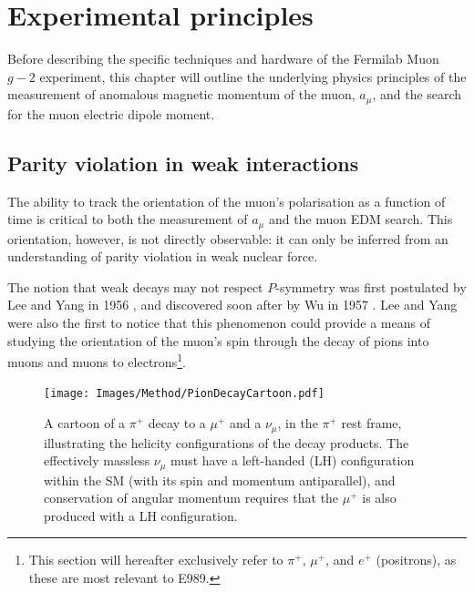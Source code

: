 \chapter{Experimental principles}\label{chap:2}

Before describing the specific techniques and hardware of the Fermilab Muon $g-2$ experiment, this chapter will outline the underlying physics principles of the measurement of anomalous magnetic momentum of the muon, $a_{\mu}$, and the search for the muon electric dipole moment. 

\section{Parity violation in weak interactions}\label{sec:ParityViolation} 

The ability to track the orientation of the muon's polarisation as a function of time is critical to both the measurement of $a_{\mu}$ and the muon EDM search. This orientation, however, is not directly observable: it can only be inferred from an understanding of parity violation in weak nuclear force. 

The notion that weak decays may not respect $P$-symmetry was first postulated by Lee and Yang in 1956 \cite{LeeAndYang}, and discovered soon after by Wu in 1957 \cite{Wu}. Lee and Yang were also the first to notice that this phenomenon could provide a means of studying the orientation of the muon's spin through the decay of pions into muons and muons to electrons\footnote{This section will hereafter exclusively refer to $\pi^{+}$, $\mu^{+}$, and $e^{+}$ (positrons), as these are most relevant to E989.}.

\begin{figure}[t!]
\centering{}
\texttt{[image: Images/Method/PionDecayCartoon.pdf]}
\caption{A cartoon of a $\pi^{+}$ decay to a $\mu^{+}$ and a $\nu_{\mu}$, in the $\pi^{+}$ rest frame, illustrating the helicity configurations of the decay products. The effectively massless $\nu_{\mu}$ must have a left-handed (LH) configuration within the SM (with its spin and momentum antiparallel), and conservation of angular momentum requires that the $\mu^{+}$ is also produced with a LH configuration.}
\label{fig:PionDecay}
\end{figure} 


